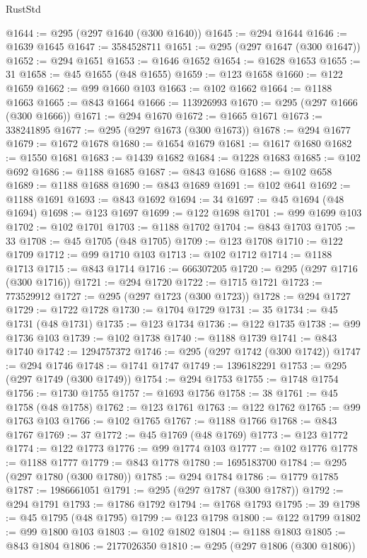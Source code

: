 \begin{lexlean}{RustStd}
\begin{coremodule}
{\begin{coremodule}
{{{{{{{{{{{{{{{{{{{{{{{{{{{{{{{{{@1644 := @295 (@297 @1640 (@300 @1640))
@1645 := @294 @1644
@1646 := @1639 @1645
@1647 := 3584528711
@1651 := @295 (@297 @1647 (@300 @1647))
@1652 := @294 @1651
@1653 := @1646 @1652
@1654 := @1628 @1653
@1655 := 31
@1658 := @45 @1655 (@48 @1655)
@1659 := @123 @1658
@1660 := @122 @1659
@1662 := @99 @1660 @103
@1663 := @102 @1662
@1664 := @1188 @1663
@1665 := @843 @1664
@1666 := 113926993
@1670 := @295 (@297 @1666 (@300 @1666))
@1671 := @294 @1670
@1672 := @1665 @1671
@1673 := 338241895
@1677 := @295 (@297 @1673 (@300 @1673))
@1678 := @294 @1677
@1679 := @1672 @1678
@1680 := @1654 @1679
@1681 := @1617 @1680
@1682 := @1550 @1681
@1683 := @1439 @1682
@1684 := @1228 @1683
@1685 := @102 @692
@1686 := @1188 @1685
@1687 := @843 @1686
@1688 := @102 @658
@1689 := @1188 @1688
@1690 := @843 @1689
@1691 := @102 @641
@1692 := @1188 @1691
@1693 := @843 @1692
@1694 := 34
@1697 := @45 @1694 (@48 @1694)
@1698 := @123 @1697
@1699 := @122 @1698
@1701 := @99 @1699 @103
@1702 := @102 @1701
@1703 := @1188 @1702
@1704 := @843 @1703
@1705 := 33
@1708 := @45 @1705 (@48 @1705)
@1709 := @123 @1708
@1710 := @122 @1709
@1712 := @99 @1710 @103
@1713 := @102 @1712
@1714 := @1188 @1713
@1715 := @843 @1714
@1716 := 666307205
@1720 := @295 (@297 @1716 (@300 @1716))
@1721 := @294 @1720
@1722 := @1715 @1721
@1723 := 773529912
@1727 := @295 (@297 @1723 (@300 @1723))
@1728 := @294 @1727
@1729 := @1722 @1728
@1730 := @1704 @1729
@1731 := 35
@1734 := @45 @1731 (@48 @1731)
@1735 := @123 @1734
@1736 := @122 @1735
@1738 := @99 @1736 @103
@1739 := @102 @1738
@1740 := @1188 @1739
@1741 := @843 @1740
@1742 := 1294757372
@1746 := @295 (@297 @1742 (@300 @1742))
@1747 := @294 @1746
@1748 := @1741 @1747
@1749 := 1396182291
@1753 := @295 (@297 @1749 (@300 @1749))
@1754 := @294 @1753
@1755 := @1748 @1754
@1756 := @1730 @1755
@1757 := @1693 @1756
@1758 := 38
@1761 := @45 @1758 (@48 @1758)
@1762 := @123 @1761
@1763 := @122 @1762
@1765 := @99 @1763 @103
@1766 := @102 @1765
@1767 := @1188 @1766
@1768 := @843 @1767
@1769 := 37
@1772 := @45 @1769 (@48 @1769)
@1773 := @123 @1772
@1774 := @122 @1773
@1776 := @99 @1774 @103
@1777 := @102 @1776
@1778 := @1188 @1777
@1779 := @843 @1778
@1780 := 1695183700
@1784 := @295 (@297 @1780 (@300 @1780))
@1785 := @294 @1784
@1786 := @1779 @1785
@1787 := 1986661051
@1791 := @295 (@297 @1787 (@300 @1787))
@1792 := @294 @1791
@1793 := @1786 @1792
@1794 := @1768 @1793
@1795 := 39
@1798 := @45 @1795 (@48 @1795)
@1799 := @123 @1798
@1800 := @122 @1799
@1802 := @99 @1800 @103
@1803 := @102 @1802
@1804 := @1188 @1803
@1805 := @843 @1804
@1806 := 2177026350
@1810 := @295 (@297 @1806 (@300 @1806))
}}}}}}}}}}}}}}}}}}}}}}}}}}}}}}}}}
\end{coremodule}}
\end{coremodule}
\end{lexlean}
